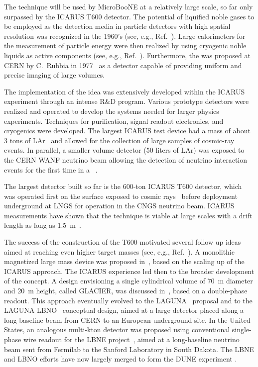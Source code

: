 The \lartpc technique will be used by MicroBooNE at a relatively large scale, so far only surpassed by the ICARUS T600 detector. The potential of liquified noble gases to be employed as the detection media in particle detectors with high spatial resolution was recognized in the 1960's (see, e.g., Ref.~\cite{Doke:1993}). Large calorimeters for the measurement of particle energy were then realized by using cryogenic noble liquids as active components (see, e.g., Ref.~\cite{Willis:1974}). Furthermore, the \lartpc was proposed at CERN by C.~Rubbia in 1977~\cite{Rubbia:1977} as a detector capable of providing uniform and precise imaging of large volumes. 

The implementation of the \lartpc idea was extensively developed within the ICARUS experiment through an intense R\&D program. Various prototype detectors were realized and operated to develop the systems needed for larger physics experiments.  Techniques for purification, signal readout electronics, and cryogenics were developed. The largest ICARUS test device had a mass of about 3 tons of LAr~\cite{Benetti:1993-3ton,Cennini:1994-3ton} and allowed for the collection of large samples of cosmic-ray events. In parallel, a smaller volume detector (50 liters of LAr) was exposed to the CERN WANF neutrino beam allowing the detection of neutrino interaction events for the first time in a \lartpc~\cite{Arneodo:1999-50l}. 

The largest \lartpc detector built so far is the 600-ton ICARUS T600 detector, which was operated first on the surface exposed to cosmic rays~\cite{Amerio:2004-T600} before deployment underground at LNGS for operation in the CNGS neutrino beam.  ICARUS measurements have shown that the technique is viable at large scales with a drift length as long as 1.5~m~\cite{Amoruso:2004-muon,Amoruso:2004-electron,Antonello:2004-cherenkov,Amoruso:2004-purity,Arneodo:2003-tracks}. 

The success of the construction of the T600 motivated several follow up ideas aimed at reaching even higher target masses (see, e.g., Ref.~\cite{Aprili:2002-proposal}). A monolithic magnetized large mass device was proposed in~\cite{Cline:2003-LANNDD}, based on the scaling up of the ICARUS approach. The ICARUS experience led then to the broader development of the \lartpc concept. A \lartpc design envisioning a single cylindrical volume of 70~m diameter and 20~m height, called GLACIER, was discussed in~\cite{Rubbia:2004-glacier,Rubbia:2009-glacier}, based on a double-phase readout. This approach eventually evolved to the LAGUNA~\cite{LAGUNAcollab} proposal and to the LAGUNA LBNO~\cite{Stahl:2012-LBNO,Agarwalla:2013-LBNO} conceptual design, aimed at a large detector placed along a long-baseline beam from CERN to an European underground site.  In the United States, an analogous multi-kton detector was proposed using conventional single-phase wire readout for the LBNE project~\cite{Adams:2013-LBNE}, aimed at a long-baseline neutrino beam sent from Fermilab to the Sanford Laboratory in South Dakota.  The LBNE and LBNO efforts have now largely merged to form the DUNE experiment \cite{DUNE}. 

